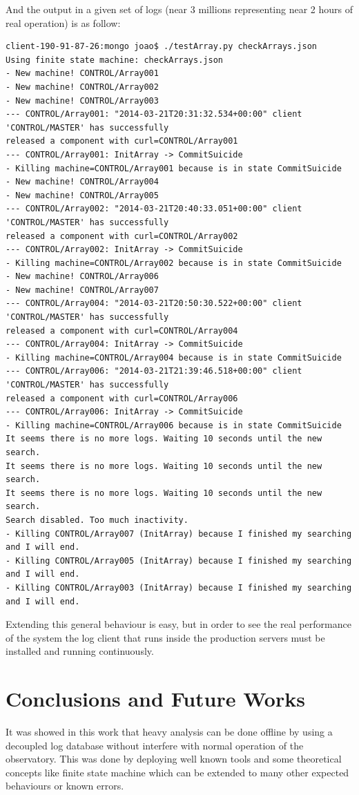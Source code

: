 \documentclass[]{spie}  %
\begin{document}
And the output in a given set of logs (near 3 millions representing near 2 hours of real operation) is as follow:
{\small 
\begin{verbatim}
client-190-91-87-26:mongo joao$ ./testArray.py checkArrays.json
Using finite state machine: checkArrays.json
- New machine! CONTROL/Array001
- New machine! CONTROL/Array002
- New machine! CONTROL/Array003
--- CONTROL/Array001: "2014-03-21T20:31:32.534+00:00" client 'CONTROL/MASTER' has successfully 
released a component with curl=CONTROL/Array001
--- CONTROL/Array001: InitArray -> CommitSuicide
- Killing machine=CONTROL/Array001 because is in state CommitSuicide
- New machine! CONTROL/Array004
- New machine! CONTROL/Array005
--- CONTROL/Array002: "2014-03-21T20:40:33.051+00:00" client 'CONTROL/MASTER' has successfully 
released a component with curl=CONTROL/Array002
--- CONTROL/Array002: InitArray -> CommitSuicide
- Killing machine=CONTROL/Array002 because is in state CommitSuicide
- New machine! CONTROL/Array006
- New machine! CONTROL/Array007
--- CONTROL/Array004: "2014-03-21T20:50:30.522+00:00" client 'CONTROL/MASTER' has successfully 
released a component with curl=CONTROL/Array004
--- CONTROL/Array004: InitArray -> CommitSuicide
- Killing machine=CONTROL/Array004 because is in state CommitSuicide
--- CONTROL/Array006: "2014-03-21T21:39:46.518+00:00" client 'CONTROL/MASTER' has successfully 
released a component with curl=CONTROL/Array006
--- CONTROL/Array006: InitArray -> CommitSuicide
- Killing machine=CONTROL/Array006 because is in state CommitSuicide
It seems there is no more logs. Waiting 10 seconds until the new search.
It seems there is no more logs. Waiting 10 seconds until the new search.
It seems there is no more logs. Waiting 10 seconds until the new search.
Search disabled. Too much inactivity.
- Killing CONTROL/Array007 (InitArray) because I finished my searching and I will end.
- Killing CONTROL/Array005 (InitArray) because I finished my searching and I will end.
- Killing CONTROL/Array003 (InitArray) because I finished my searching and I will end.
\end{verbatim}
}

Extending this general behaviour is easy, but in order to see the real
performance of the system the log client that runs inside the production
servers must be installed and running continuously.

\section{Conclusions and Future Works}
It was showed in this work that heavy analysis can be done offline by using a
decoupled log database without interfere with normal operation of the
observatory. This was done by deploying well known tools and some theoretical
concepts like finite state machine which can be extended to many other expected
behaviours or known errors. 
\end{document}
